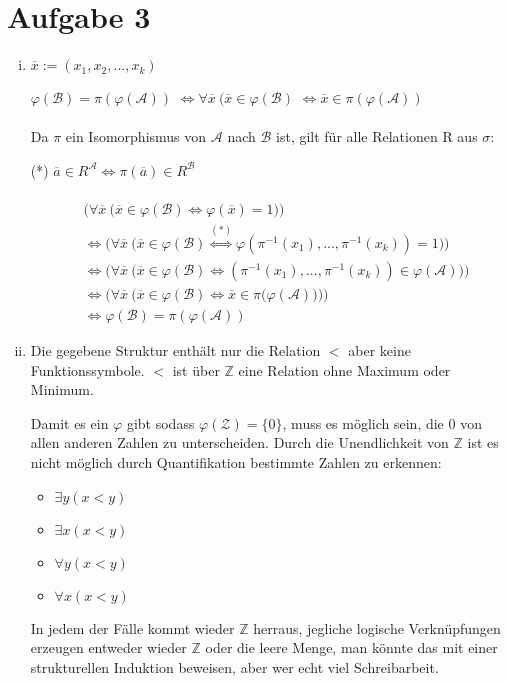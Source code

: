 \documentclass[a4paper,10pt]{article}
\newcommand{\Z}{\mathbb{Z}}
\begin{document}
\section*{Aufgabe 3}
\begin{enumerate}[(i)]
\item
$\overline{x} := (x_1,x_2,...,x_k)$

$\varphi(\mathcal{B}) = \pi(\varphi(\mathcal{A}))$
$\Leftrightarrow \forall \overline{x}~ (\overline{x} \in \varphi(\mathcal{B})$
$\Leftrightarrow \overline{x} \in \pi(\varphi(\mathcal{A}))$
\\
\\
Da $\pi$ ein Isomorphismus von $\mathcal{A}$ nach $\mathcal{B}$ ist, gilt für alle Relationen R aus $\sigma$: 

(*) $\overline{a} \in R^{\mathcal{A}} \Leftrightarrow \pi(\overline{a}) \in R^{\mathcal{B}}$
\\
\\
\begin{align*}
&\big(\forall \overline{x}~ \big( \overline{x} \in \varphi(\mathcal{B})  \Leftrightarrow \varphi(\overline{x}) =1\big)\big) \\
&\Leftrightarrow \big(\forall \overline{x}~ \big( \overline{x} \in \varphi(\mathcal{B})  \overset{(*)}{\Leftrightarrow} \varphi(\pi^{-1}(x_1),...,\pi^{-1}(x_k)) = 1\big)\big) \\
&\Leftrightarrow \big(\forall \overline{x}~ \big( \overline{x} \in \varphi(\mathcal{B})  \Leftrightarrow (\pi^{-1}(x_1),...,\pi^{-1}(x_k)) \in \varphi(\mathcal{A}))\big) \\ 
&\Leftrightarrow \big(\forall \overline{x}~ \big( \overline{x} \in \varphi(\mathcal{B})  \Leftrightarrow \overline{x} \in \pi(\varphi(\mathcal{A}) \big)\big)\big) \\
&\Leftrightarrow \varphi(\mathcal{B}) = \pi(\varphi(\mathcal{A}))
\end{align*}


\item
Die gegebene Struktur enthält nur die Relation $<$ aber keine Funktionssymbole. 
$<$ ist über $\mathbb{Z}$ eine Relation ohne Maximum oder Minimum. 

Damit es ein $\varphi$ gibt sodass $\varphi(\mathcal{Z}) = \lbrace 0 \rbrace$, muss es möglich sein, die $0$ von allen anderen Zahlen zu unterscheiden. Durch die Unendlichkeit von $\mathbb{Z}$ ist es nicht möglich durch Quantifikation bestimmte Zahlen zu erkennen:
\begin{itemize}
\item
$\exists y (x < y)$
\item
$\exists x (x < y)$
\item
$\forall y (x < y)$
\item
$\forall x (x < y)$
\end{itemize}
In jedem der Fälle kommt wieder $\Z$ herraus, jegliche logische Verknüpfungen erzeugen entweder wieder $\Z$ oder die leere Menge, man könnte das mit einer strukturellen Induktion beweisen, aber wer echt viel Schreibarbeit.


\end{enumerate}
\end{document}
